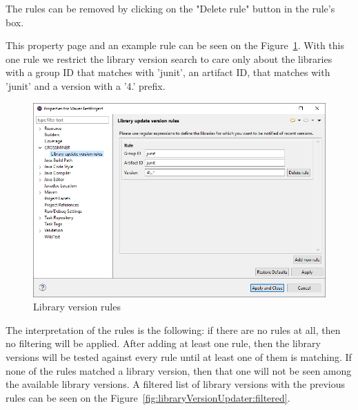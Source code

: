 \documentclass[11pt,a4paper]{book}
\begin{document}
The rules can be removed by clicking on the "Delete rule" button in the rule's box.

This property page and an example rule can be seen on the Figure~\ref{fig:libraryVersionRules}. With this one rule we restrict the library version search to care only about the libraries with a group ID that matches with 'junit', an artifact ID, that matches with 'junit' and a version with a '4.' prefix.

\begin{figure}[h]
	\centering
	\includegraphics[width=\linewidth]{pic/library-version-rules.png}
	\caption{Library version rules}
	\label{fig:libraryVersionRules}
\end{figure}

The interpretation of the rules is the following:
if there are no rules at all, then no filtering will be applied.
After adding at least one rule, then the library versions will be tested against every rule until at least one of them is matching. If none of the rules matched a library version, then that one will not be seen among the available library versions. A filtered list of library versions with the previous rules can be seen on the Figure~\ref{fig:libraryVersionUpdater:filtered}.
\end{document}
